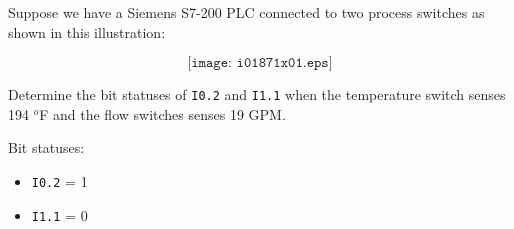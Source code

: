 

Suppose we have a Siemens S7-200 PLC connected to two process switches as shown in this illustration:

$$\texttt{[image: i01871x01.eps]}$$

Determine the bit statuses of {\tt I0.2} and {\tt I1.1} when the temperature switch senses 194 $^{o}$F and the flow switches senses 19 GPM.







Bit statuses:

\begin{itemize}
\item{} {\tt I0.2} = 1
\item{} {\tt I1.1} = 0
\end{itemize}











